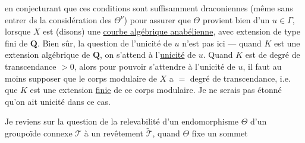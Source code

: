 en conjecturant que ces conditions  sont suffisamment draconiennes  (même sans entrer ds la considération des $\Theta^\nu$) pour assurer que $\Theta$ provient bien d'un $u\in\Gamma$,  lorsque $X$ est (disons) une \uline{courbe algébrique anabélienne}, avec extension de type fini de $\mathbf{Q}$.
Bien sûr, la question de l'unicité de $u$ n'est pas  ici --- quand $K$ est une extension algébrique de $\mathbf{Q}$, on s'attend à l'\uline{unicité} de $u$. Quand $K$ est de degré de transcendance $>0$, alors pour pouvoir s'attendre à l'unicité de $u$, il faut au moins supposer que le corps modulaire de $X$ a $=$ degré de transcendance, i.e. que $K$ est une extension \uline{finie} de ce corps modulaire. Je ne serais pas étonné qu'on ait unicité dans ce cas.

Je reviens sur la question de la relevabilité d'un \deleted{$\unsure{\Theta}$} endomorphisme $\Theta$ d'un groupoïde connexe $\mathcal{T}$ à un revêtement $\widetilde{\mathcal{T}}$, quand $\Theta$ fixe un sommet
